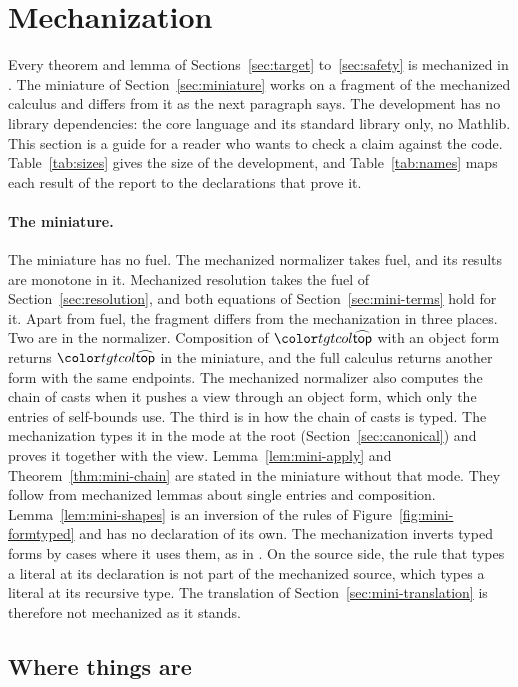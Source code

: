 \mathplain
\section{Mechanization}\label{sec:mechanization}

Every theorem and lemma of Sections~\ref{sec:target} to~\ref{sec:safety} is mechanized in \Lean \cite{demoura2021lean}. The miniature of Section~\ref{sec:miniature} works on a fragment of the mechanized calculus and differs from it as the next paragraph says. The development has no library dependencies: the core language and its standard library only, no Mathlib. This section is a guide for a reader who wants to check a claim against the code. Table~\ref{tab:sizes} gives the size of the development, and Table~\ref{tab:names} maps each result of the report to the declarations that prove it.

\paragraph{The miniature.}
The miniature has no fuel. The mechanized normalizer takes fuel, and its results are monotone in it. Mechanized resolution takes the fuel of Section~\ref{sec:resolution}, and both equations of Section~\ref{sec:mini-terms} hold for it. Apart from fuel, the fragment differs from the mechanization in three places. Two are in the normalizer. Composition of $\form{top}$ with an object form returns $\form{top}$ in the miniature, and the full calculus returns another form with the same endpoints. The mechanized normalizer also computes the chain of casts when it pushes a view through an object form, which only the entries of self-bounds use. The third is in how the chain of casts is typed. The mechanization types it in the mode at the root (Section~\ref{sec:canonical}) and proves it together with the view. Lemma~\ref{lem:mini-apply} and Theorem~\ref{thm:mini-chain} are stated in the miniature without that mode. They follow from mechanized lemmas about single entries and composition. Lemma~\ref{lem:mini-shapes} is an inversion of the rules of Figure~\ref{fig:mini-formtyped} and has no declaration of its own. The mechanization inverts typed forms by cases where it uses them, as in . On the source side, the rule that types a literal at its declaration is not part of the mechanized source, which types a literal at its recursive type. The translation of Section~\ref{sec:mini-translation} is therefore not mechanized as it stands.

\subsection{Where things are}

